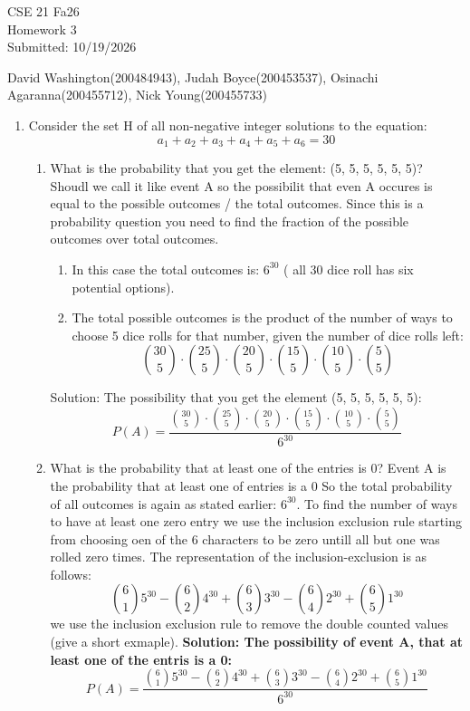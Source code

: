 \documentclass{article}
\begin{document}
\begin{flushright}
CSE 21 Fa26\\
Homework 3\\
Submitted: 10/19/2026
\end{flushright}

\begin{center}
David Washington(200484943), Judah Boyce(200453537), Osinachi Agaranna(200455712), Nick Young(200455733)
\end{center}

\begin{enumerate}
    \item  Consider the set H of all non-negative integer solutions to the equation:
    \[ a_1 + a_2 + a_3 + a_4 + a_5 + a_6 = 30 \]
    \begin{enumerate}
        \item What is the probability that you get the element: (5, 5, 5, 5, 5, 5)? Shoudl we call it like event A so the possibilit that even A occures is equal to the possible outcomes / the total outcomes. Since this is a probability question you need to find the fraction of the possible outcomes over total outcomes.
        \begin{enumerate}
            \item  In this case the total outcomes is: $6^{30}$ ( all 30 dice roll has six potential options).
            \item  The total possible outcomes is the product of the number of ways to choose 5 dice rolls for that number, given the number of dice rolls left:
            \[  \binom{30}{5} \cdot \binom{25}{5} \cdot \binom{20}{5} \cdot \binom{15}{5} \cdot \binom{10}{5} \cdot \binom{5}{5} \] 
        \end{enumerate}
        Solution:
        The possibility that you get the element (5, 5, 5, 5, 5, 5): 
        \[ P(A) = \frac{\binom{30}{5} \cdot \binom{25}{5} \cdot \binom{20}{5} \cdot \binom{15}{5} \cdot \binom{10}{5} \cdot \binom{5}{5}}{ 6^{30}} \] 
        \item What is the probability that at least one of the entries is 0?
        Event A is the probability that at least one of entries is a 0
        So the total probability of all outcomes is again as stated earlier: $6^{30}$. To find the number of ways to have at least one zero entry we use the inclusion exclusion rule starting from choosing oen of the 6 characters to be zero untill all but one was rolled zero times. The representation of the inclusion-exclusion is as follows:
        \[ \binom{6}{1} 5^{30} - \binom{6}{2} 4^{30} + \binom{6}{3} 3^{30} - \binom{6}{4} 2^{30}  + \binom{6}{5} 1^{30} \] 
        we use the inclusion exclusion rule to remove the double counted values (give a short exmaple). 
        \textbf{Solution: The possibility of event A, that at least one of the entris is a 0:}
        \[ P(A) = \frac{\binom{6}{1} 5^{30} - \binom{6}{2} 4^{30} + \binom{6}{3} 3^{30} - \binom{6}{4} 2^{30}  + \binom{6}{5} 1^{30}}{6^{30}} \]   


\end{enumerate}
\end{enumerate}
\end{document}
